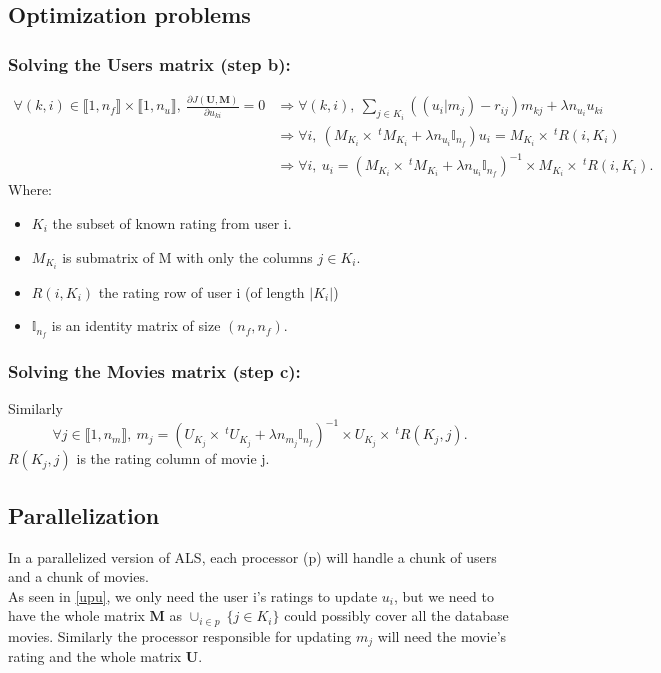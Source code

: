 \documentclass[10pt]{article}
\begin{document}
\subsection{Optimization problems}
\subsubsection{Solving the Users matrix (step b):\label{upu}}
\[\begin{split}
\forall (k,i)\in\llbracket 1,n_f\rrbracket\times\llbracket 1,n_u\rrbracket, \:\frac{\partial J(\mathbf U,\mathbf M)}{\partial u_{ki}}=0 &\Rightarrow \forall (k,i), \: \sum\limits_{j \in K_i}((u_i|m_j)-r_{ij})m_{kj}+\lambda n_{u_i}u_{ki}\\
&\Rightarrow \forall i,  \:  (M_{K_i}\times~^tM_{K_i}+\lambda n_{u_i}\mathbb I_{n_f})u_i=M_{K_i}\times ~^tR(i,K_i)\\
&\Rightarrow \forall i,  \: u_i=(M_{K_i}\times~^tM_{K_i}+\lambda n_{u_i}\mathbb I_{n_f})^{-1}\times M_{K_i}\times~^tR(i,K_i).
\end{split}\]
Where:
\begin{itemize}
\item $K_i$ the subset of known rating from user i.
\item $M_{K_i}$ is submatrix of M with only the columns $j\in K_i$.
\item $R(i,K_i)$ the rating row of user i (of length $|K_i|$)
\item $\mathbb I_{n_f}$ is an identity matrix of size $(n_f,n_f)$.
\end{itemize}
\subsubsection{Solving the Movies matrix (step c):\label{upm}}
Similarly 
\[
\forall j\in\llbracket 1,n_m\rrbracket,\: m_j=(U_{K_j}\times~^tU_{K_j}+\lambda n_{m_j}\mathbb I_{n_f})^{-1}\times U_{K_j}\times~^tR(K_j,j).
\]
$R(K_j,j)$ is the rating column of movie j.
\subsection{Parallelization}
In a parallelized version of ALS, each processor (p) will handle a chunk of users and a chunk of movies.\\
As seen in \ref{upu}, we only need the user i's ratings to update $u_i$, but we need to have the whole matrix $\mathbf M$ as $\cup_{i\in p}\:\{j\in K_i\}$ could possibly cover all the database movies. Similarly the processor responsible for updating $m_j$ will need the movie's rating and the whole matrix $\mathbf U$.
\end{document}
